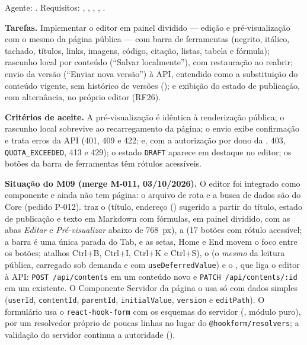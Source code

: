 \noindent{}\quad Agente: . Requisitos: , , , , .

\textbf{Tarefas.} Implementar o editor em painel dividido --- edição e pré-visualização com o mesmo  da página pública --- com barra de ferramentas (negrito, itálico, tachado, títulos, links, imagens, código, citação, listas, tabela e fórmula); rascunho local por conteúdo (``Salvar localmente''), com restauração ao reabrir; envio da versão (``Enviar nova versão'') à API, entendido como a substituição do conteúdo vigente, sem histórico de versões (); e exibição do estado de publicação, com alternância, no próprio editor (RF26).

\textbf{Critérios de aceite.} A pré-visualização é idêntica à renderização pública; o rascunho local sobrevive ao recarregamento da página; o envio exibe confirmação e trata erros da API (401, 409 e 422; e, com a autorização por dono da , 403, \texttt{QUOTA\_EXCEEDED}, 413 e 429); o estado \texttt{DRAFT} aparece em destaque no editor; os botões da barra de ferramentas têm rótulos acessíveis.



\textbf{Situação do M09 (merge M-011, 03/10/2026).} O editor foi integrado como componente e ainda não tem página: o arquivo de rota e a busca de dados são do Core (pedido P-012).  traz o  (título, endereço () sugerido a partir do título, estado de publicação e texto em Markdown com fórmulas, em painel dividido, com as abas \emph{Editar} e \emph{Pré-visualizar} abaixo de 768~px), a  (17 botões com rótulo acessível; a barra é uma única parada do Tab, e as setas, Home e End movem o foco entre os botões; atalhos Ctrl+B, Ctrl+I, Ctrl+K e Ctrl+S), o  (o \emph{mesmo}  da leitura pública, carregado sob demanda e com \texttt{useDeferredValue}) e o , que liga o editor à API: \texttt{POST /api/contents} em um conteúdo novo e \texttt{PATCH /api/contents/:id} em um existente. O Componente Servidor da página o usa só com dados simples (\texttt{userId}, \texttt{contentId}, \texttt{parentId}, \texttt{initialValue}, \texttt{version} e \texttt{editPath}). O formulário usa o \texttt{react-hook-form} com os esquemas do servidor (, módulo puro), por um resolvedor próprio de poucas linhas no lugar do \texttt{@hookform/resolvers}; a validação do servidor continua a autoridade ().

